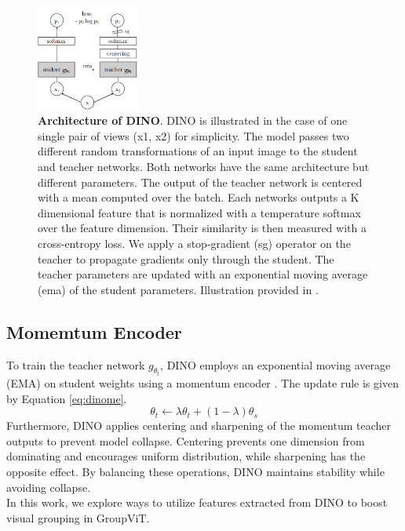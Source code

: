 \begin{figure}
  \centering
  \includegraphics[width=0.3\textwidth]{figures/experiments/figures/dino.png}
  \caption[\textbf{DINO Architecture }]{\textbf{Architecture of DINO}. DINO is illustrated in the case of one single pair of views (x1, x2) for simplicity. The
model passes two different random transformations of an input
image to the student and teacher networks. Both networks have
the same architecture but different parameters. The output of the
teacher network is centered with a mean computed over the batch.
Each networks outputs a K dimensional feature that is normalized
with a temperature softmax over the feature dimension. Their
similarity is then measured with a cross-entropy loss. We apply a
stop-gradient (sg) operator on the teacher to propagate gradients
only through the student. The teacher parameters are updated with
an exponential moving average (ema) of the student parameters. Illustration provided in 
\cite{caron2021emerging}.}
  \label{fig:dino}
\end{figure}
\subsection{Momemtum Encoder}
To train the teacher network \( g_{\theta_t} \), DINO employs an exponential moving average (EMA) on student weights using a momentum encoder \cite{caron2021emerging}. The update rule is given by Equation \ref{eq:dinome}.
\begin{equation}
\label{eq:dinome}
\theta_t \leftarrow \lambda\theta_t + (1 - \lambda)\theta_s
\end{equation}
Furthermore, DINO applies centering and sharpening of the momentum teacher outputs to prevent model collapse. Centering prevents one dimension from dominating and encourages uniform distribution, while sharpening has the opposite effect. By balancing these operations, DINO maintains stability while avoiding collapse.\\
In this work, we explore ways to utilize features extracted from DINO to boost visual grouping in GroupViT.


